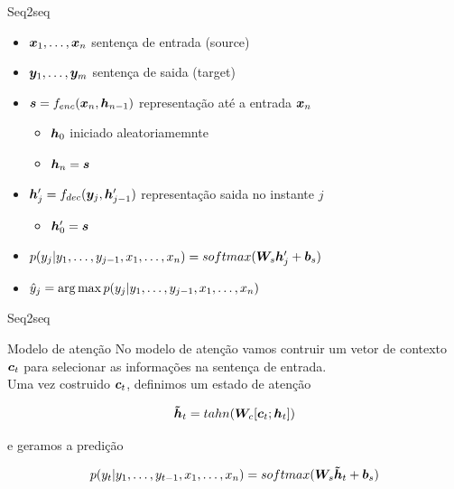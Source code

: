 \documentclass[10pt]{beamer}
\begin{document}
\begin{frame}{Seq2seq}
\begin{itemize}
\item $\bm{x}_1, \dots, \bm{x}_n$ sentença de entrada (source)
\item $\bm{y}_1, \dots, \bm{y}_m$ sentença de saida (target)
\item $\bm{s} = f_{enc}(\bm{x}_n, \bm{h}_{n-1})$ representação  até a entrada $\bm{x}_n$
\begin{itemize}
\item $\bm{h}_0$ iniciado aleatoriamemnte
\item $\bm{h}_n = \bm{s}$  
\end{itemize}
\item $\bm{h}^{\prime}_j = f_{dec}(\bm{y}_j, \bm{h}^{\prime}_{j-1})$ representação saida no instante $j$
\begin{itemize}
\item $\bm{h}^{\prime}_0 = \bm{s}$
\end{itemize}

\item $p(y_j | y_1, \dots, y_{j-1}, x_1, \dots, x_{n}) = softmax(\bm{W}_{s}  \bm{h}^{\prime}_j + \bm{b}_s)$

\item $\hat{y}_j = \operatorname*{arg\,max} p(y_j | y_1, \dots, y_{j-1}, x_1, \dots, x_{n})$
\end{itemize}
\end{frame}

\begin{frame}{Seq2seq}

\end{frame}


\begin{frame}{Modelo de atenção}
 No modelo de atenção vamos contruir um vetor de contexto $\bm{c}_t$ para selecionar as informações na sentença de entrada.\\
 Uma vez costruido $\bm{c}_t$, definimos um estado de atenção

\begin{equation*}
\bm{\tilde{h}}_t = tahn(\bm{W}_c[\bm{c}_t;\bm{h}_t])
\end{equation*}


 e geramos a predição

\begin{equation*}
p(y_t | y_1, \dots, y_{t-1}, x_1, \dots, x_{n}) = softmax(\bm{W}_{s}  \bm{\tilde{h}}_t + \bm{b}_s)
\end{equation*}
\end{frame}
\end{document}
